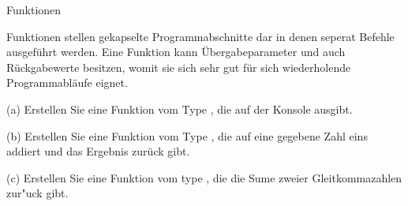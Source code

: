 \begin{exercise}{Funktionen}
\begin{body}
Funktionen stellen gekapselte Programmabschnitte dar in denen seperat Befehle ausgef\"uhrt werden.
Eine Funktion kann \"Ubergabeparameter und auch R\"uckgabewerte besitzen, womit sie sich sehr gut f\"ur sich wiederholende Programmabl\"aufe eignet.
\medskip
\begin{parts}
\item[(a)] Erstellen Sie eine Funktion vom Type , die  auf der Konsole ausgibt.
\item[(b)] Erstellen Sie eine Funktion vom Type , die auf eine gegebene Zahl eins addiert und das Ergebnis zur\"uck gibt.
\item[(c)] Erstellen Sie eine Funktion vom type , die die Sume zweier Gleitkommazahlen zur"uck gibt.
\end{parts}
\end{body}


\begin{solution}
\end{solution}

\end{exercise}
